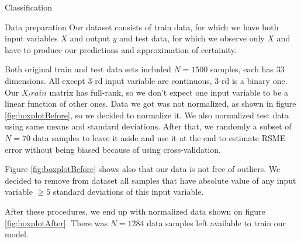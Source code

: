 \documentclass{article}
\begin{document}
\begin{section}{Classification}
\begin{subsection}{Data preparation}
Our dataset consists of train data, for which we have both input variables $X$ and output $y$ and test data, for which we observe only $X$ and have to produce our predictions and approximation of certainity.

Both original train and test data sets included $N=1500$ samples, each has $33$ dimensions. All except $3$-rd input variable are continuous, $3$-rd is a binary one. Our $X_train$ matrix has full-rank, so we don't expect one input variable to be a linear function of other ones. 
Data we got was not normalized, as shown in figure \ref{fig:boxplotBefore}, so we decided to normalize it. We also normalized test data using same means and standard deviations. After that, we randomly a subset of $N=70$ data samples to leave it aside and use it at the end to estimate RSME error without being biased because of using cross-validation. 

Figure \ref{fig:boxplotBefore} shows also that our data is not free of outliers. We decided to remove from dataset all samples that have absolute value of any input variable $\ge 5$ standard deviations of this input variable.

After these procedures, we end up with normalized data shown on figure \ref{fig:boxplotAfter}. There was $N=1284$ data samples left available to train our model.

\begin{figure}[!h]
\center
{}
\hfill
{}
\caption{}
\end{figure}


\end{subsection}
\end{section}
\end{document}
